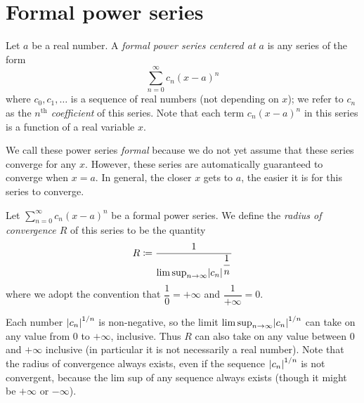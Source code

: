 \section{Formal power series}\label{ii:sec:4.1}

\begin{defn}\label{ii:4.1.1}
  Let \(a\) be a real number.
  A \emph{formal power series centered at \(a\)} is any series of the form
  \[
    \sum_{n = 0}^\infty c_n (x - a)^n
  \]
  where \(c_0, c_1, \dots\) is a sequence of real numbers (not depending on \(x\));
  we refer to \(c_n\) as the \emph{\(n^{\text{th}}\) coefficient} of this series.
  Note that each term \(c_n (x - a)^n\) in this series is a function of a real variable \(x\).
\end{defn}

\begin{note}
  We call these power series \emph{formal} because we do not yet assume that these series converge for any \(x\).
  However, these series are automatically guaranteed to converge when \(x = a\).
  In general, the closer \(x\) gets to \(a\), the easier it is for this series to converge.
\end{note}

\setcounter{thm}{2}
\begin{defn}\label{ii:4.1.3}
  Let \(\sum_{n = 0}^\infty c_n (x - a)^n\) be a formal power series.
  We define the \emph{radius of convergence \(R\)} of this series to be the quantity
  \[
    R \coloneqq \dfrac{1}{\limsup_{n \to \infty} \abs{c_n}^{\dfrac{1}{n}}}
  \]
  where we adopt the convention that \(\dfrac{1}{0} = +\infty\) and \(\dfrac{1}{+\infty} = 0\).
\end{defn}

\begin{rmk}\label{ii:4.1.4}
  Each number \(\left\lvert c_n\right\rvert^{1 / n}\) is non-negative, so the limit \(\limsup_{n \to \infty} \abs{c_n}^{1 / n}\) can take on any value from \(0\) to \(+\infty\), inclusive.
  Thus \(R\) can also take on any value between \(0\) and \(+\infty\) inclusive
  (in particular it is not necessarily a real number).
  Note that the radius of convergence always exists, even if the sequence \(\left\lvert c_n\right\rvert^{1 / n}\) is not convergent, because the lim sup of any sequence always exists
  (though it might be \(+\infty\) or \(-\infty\)).
\end{rmk}

